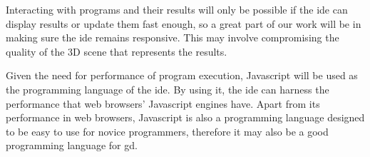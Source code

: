 \documentclass{./llncs2e/llncs}
\begin{document}
	Interacting with programs and their results will only be possible if the \ac{ide} can display results or update them fast enough, so a great part of our work will be in making sure the \ac{ide} remains responsive.
	This may involve compromising the quality of the 3D scene that represents the results.
	
	Given the need for performance of program execution, Javascript will be used as the programming language of the \ac{ide}.
	By using it, the \ac{ide} can harness the performance that web browsers' Javascript engines have.
	Apart from its performance in web browsers, Javascript is also a programming language designed to be easy to use for novice programmers, therefore it may also be a good programming language for \ac{gd}.
\end{document}
